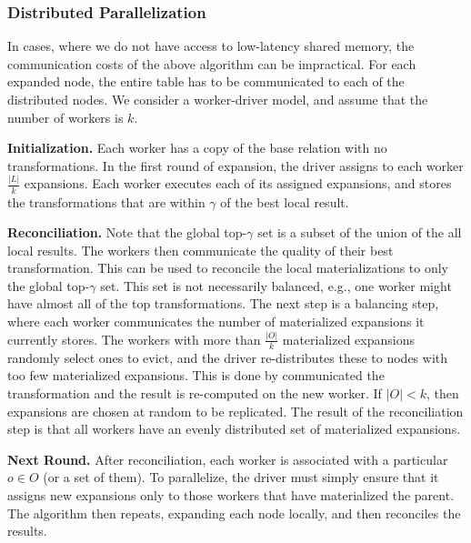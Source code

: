\subsubsection{Distributed Parallelization}
In cases, where we do not have access to low-latency shared memory, the communication costs of the above algorithm can be impractical. For each expanded node, the entire table has to be communicated to each of the distributed nodes.
We consider a worker-driver model, and assume that the number of workers is $k$.

\vspace{0.25em} \noindent  \textbf{Initialization. } 
Each worker has a copy of the base relation with no transformations.
In the first round of expansion, the driver assigns to each worker $\frac{|L|}{k}$ expansions. 
Each worker executes each of its assigned expansions, and stores the transformations that are within $\gamma$ of the best local result.

\vspace{0.25em} \noindent  \textbf{Reconciliation. }  Note that the global top-$\gamma$ set is a subset of the union of the all local results.
The workers then communicate the quality of their best transformation. This can be used to reconcile the local materializations to only the global top-$\gamma$ set.
This set is not necessarily balanced, e.g., one worker might have almost all of the top transformations.
The next step is a balancing step, where each worker communicates the number of materialized expansions it currently stores.
The workers with more than $\frac{|O|}{k}$ materialized expansions  randomly select ones to evict, and the driver re-distributes these to nodes with too few materialized expansions.
This is done by communicated the transformation and the result is re-computed on the new worker.
If $|O| < k$, then expansions are chosen at random to be replicated.
The result of the reconciliation step is that all workers have an evenly distributed set of materialized expansions.

\vspace{0.25em} \noindent  \textbf{Next Round. } After reconciliation, each worker is associated with a particular $o \in O$ (or a set of them). To parallelize, the driver must simply ensure that it assigns new expansions only to those workers that have materialized the parent.
The algorithm then repeats, expanding each node locally, and then reconciles the results.









